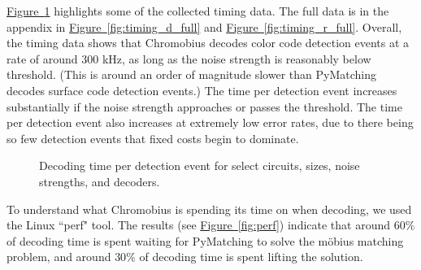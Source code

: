 \documentclass[onecolumn,unpublished,a4paper]{quantumarticle}
\theoremstyle{definition}
\theoremstyle{definition}
\theoremstyle{definition}
\newcommand{\fig}[1]{\hyperref[fig:#1]{Figure~\ref*{fig:#1}}}
\begin{document}
\fig{timing_d} highlights some of the collected timing data.
The full data is in the appendix in \fig{timing_d_full} and \fig{timing_r_full}.
Overall, the timing data shows that Chromobius decodes color code detection events at a rate of around 300 kHz, as long as the noise strength is reasonably below threshold.
(This is around an order of magnitude slower than PyMatching decodes surface code detection events.)
The time per detection event increases substantially if the noise strength approaches or passes the threshold.
The time per detection event also increases at extremely low error rates, due to there being so few detection events that fixed costs begin to dominate.

\begin{figure}
    \centering
    \caption{
        Decoding time per detection event for select circuits, sizes, noise strengths, and decoders.
    }
    \label{fig:timing_d}
\end{figure}

To understand what Chromobius is spending its time on when decoding, we used the Linux ``perf" tool.
The results (see \fig{perf}) indicate that around $60\%$ of decoding time is spent waiting for PyMatching to solve the m{\"o}bius matching problem, and around $30\%$ of decoding time is spent lifting the solution.
\end{document}

